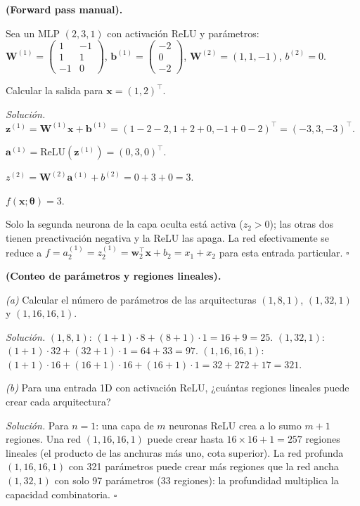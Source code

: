 \begin{ejercicio}
\label{ej:forward_manual}
\textbf{(Forward pass manual).}

Sea un MLP $(2, 3, 1)$ con activación ReLU y parámetros:
$\bm{W}^{(1)} = \begin{pmatrix} 1 & -1 \\ 1 & 1 \\ -1 & 0
\end{pmatrix}$,
$\bm{b}^{(1)} = \begin{pmatrix} -2 \\ 0 \\ -2 \end{pmatrix}$,
$\bm{W}^{(2)} = (1, 1, -1)$, $b^{(2)} = 0$.

Calcular la salida para $\bm{x} = (1, 2)^\top$.

\medskip\noindent\textit{Solución.}
$\bm{z}^{(1)} = \bm{W}^{(1)}\bm{x}+\bm{b}^{(1)}
= (1-2-2, 1+2+0, -1+0-2)^\top = (-3, 3, -3)^\top$.

$\bm{a}^{(1)} = \text{ReLU}(\bm{z}^{(1)}) = (0, 3, 0)^\top$.

$z^{(2)} = \bm{W}^{(2)}\bm{a}^{(1)}+b^{(2)} = 0+3+0 = 3$.

$f(\bm{x};\bm{\theta}) = 3$.

Solo la segunda neurona de la capa oculta está activa ($z_2 > 0$); las
otras dos tienen preactivación negativa y la ReLU las apaga. La red
efectivamente se reduce a $f = a_2^{(1)} = z_2^{(1)} = \bm{w}_2^\top
\bm{x}+b_2 = x_1+x_2$ para esta entrada particular. $\square$
\end{ejercicio}

\begin{ejercicio}
\label{ej:conteo_parametros}
\textbf{(Conteo de parámetros y regiones lineales).}

\medskip\noindent\textit{(a)} Calcular el número de parámetros de las
arquitecturas $(1, 8, 1)$, $(1, 32, 1)$ y $(1, 16, 16, 1)$.

\medskip\noindent\textit{Solución.}
$(1, 8, 1)$: $(1+1)\cdot 8 + (8+1)\cdot 1 = 16 + 9 = 25$.
$(1, 32, 1)$: $(1+1)\cdot 32 + (32+1)\cdot 1 = 64 + 33 = 97$.
$(1, 16, 16, 1)$: $(1+1)\cdot 16 + (16+1)\cdot 16 + (16+1)\cdot 1 =
32 + 272 + 17 = 321$.

\medskip\noindent\textit{(b)} Para una entrada 1D con activación ReLU,
¿cuántas regiones lineales puede crear cada arquitectura?

\medskip\noindent\textit{Solución.}
Para $n = 1$: una capa de $m$ neuronas ReLU crea a lo sumo $m + 1$
regiones. Una red $(1, 16, 16, 1)$ puede crear hasta $16 \times 16 + 1
= 257$ regiones lineales (el producto de las anchuras más uno, cota
superior). La red profunda $(1, 16, 16, 1)$ con 321 parámetros puede
crear más regiones que la red ancha $(1, 32, 1)$ con solo 97 parámetros
(33 regiones): la profundidad multiplica la capacidad combinatoria.
$\square$
\end{ejercicio}

